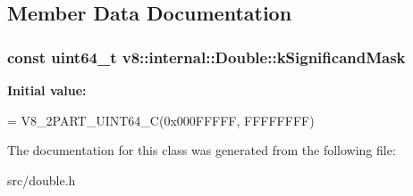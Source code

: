 \subsection{Member Data Documentation}
\hypertarget{classv8_1_1internal_1_1_double_a556ce351853d566d0f8a266981c00447}{}
\subsubsection[{k\+Significand\+Mask}]{\setlength{\rightskip}{0pt plus 5cm}const uint64\+\_\+t v8\+::internal\+::\+Double\+::k\+Significand\+Mask\hspace{0.3cm}{\ttfamily [static]}}\label{classv8_1_1internal_1_1_double_a556ce351853d566d0f8a266981c00447}
{\bfseries Initial value\+:}
\begin{DoxyCode}
=
      V8\_2PART\_UINT64\_C(0x000FFFFF, FFFFFFFF)
\end{DoxyCode}


The documentation for this class was generated from the following file\+:\begin{DoxyCompactItemize}
\item 
src/double.\+h\end{DoxyCompactItemize}
